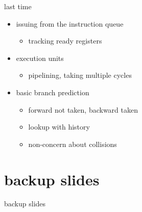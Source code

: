 \date{}
\title{}
\date{}

\begin{frame}
    \titlepage
\end{frame}

\begin{frame}{last time}
    \begin{itemize}
    \item issuing from the instruction queue
        \begin{itemize}
        \item tracking ready registers
        \end{itemize}
    \item execution units
        \begin{itemize}
        \item pipelining, taking multiple cycles
        \end{itemize}
    \item basic branch prediction
        \begin{itemize}
        \item forward not taken, backward taken
        \item lookup with history
        \item non-concern about collisions
        \end{itemize}
    \end{itemize}
\end{frame}



\section{backup slides}
\begin{frame}{backup slides}
\end{frame}


